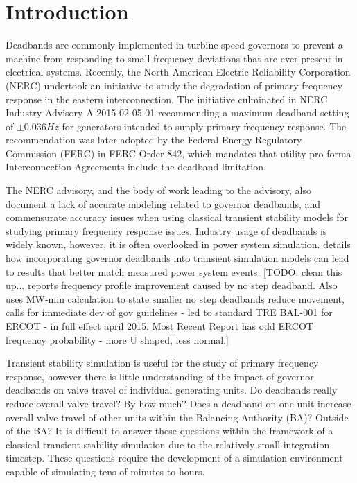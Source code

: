 \section{Introduction}
Deadbands are commonly implemented in turbine speed governors to prevent a machine from responding to small frequency deviations that are ever present in electrical systems. Recently, the North American Electric Reliability Corporation (NERC) undertook an initiative to study the degradation of primary frequency response in the eastern interconnection. The initiative culminated in NERC Industry Advisory A-2015-02-05-01\cite{NERCxxxx} recommending a maximum deadband setting of $\pm 0.036Hz$ for generators intended to supply primary frequency response. The recommendation was later adopted by the Federal Energy Regulatory Commission (FERC) in FERC Order 842, which mandates that utility pro forma Interconnection Agreements include the deadband limitation\cite{FERCxxxx}.

The NERC advisory, and the body of work leading to the advisory, also document a lack of accurate modeling related to governor deadbands, and commensurate accuracy issues when using classical transient stability models for studying primary frequency response issues. Industry usage of deadbands is widely known, however, it is often overlooked in power system simulation.
\cite{kou2016} details how incorporating governor deadbands into transient simulation models can lead to results that better match measured power system events. [TODO: clean this up... \cite{nercFRI2012} reports frequency profile improvement caused by no step deadband. Also uses MW-min calculation to state smaller no step deadbands reduce movement, calls for immediate dev of gov guidelines - led to standard TRE BAL-001 for ERCOT - in full effect april 2015. Most Recent Report \cite{nercFRAA2018} has odd ERCOT frequency probability - more U shaped, less normal.]

Transient stability simulation is useful for the study of primary frequency response, however there is little understanding of the impact of governor deadbands on valve travel of individual generating units. Do deadbands really reduce overall valve travel? By how much? Does a deadband on one unit increase overall valve travel of other units within the Balancing Authority (BA)? Outside of the BA? It is difficult to answer these questions within the framework of a classical transient stability simulation due to the relatively small integration timestep. These questions require the development of a simulation environment capable of simulating tens of minutes to hours.

